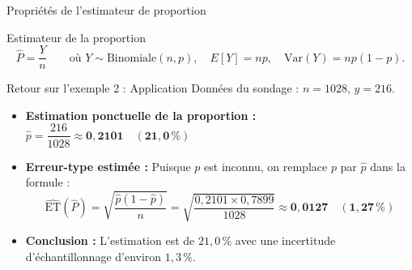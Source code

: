 \documentclass{BeamerTemplate}
\begin{document}
\begin{frame}[t]{Propriétés de l'estimateur de proportion}
  \begin{Boite}{Estimateur de la proportion}
    $$\widehat{P} = \frac{Y}{n} \qquad \text{où } Y \sim \text{Binomiale}(n, p), \quad E[Y] = np, \quad \text{Var}(Y) = np(1-p).$$
  \end{Boite}

  \medskip
\end{frame}

\begin{frame}[t]{Retour sur l'exemple 2 : Application}
  Données du sondage : $n = 1028$, $y = 216$.

  \medskip
  \begin{itemize}\itemsep 3mm
    \item<1-> \textbf{Estimation ponctuelle de la proportion :}
      $\hat{p} = \dfrac{216}{1028} \approx \mathbf{0{,}2101 \quad (21{,}0\,\%)}$

    \item<2-> \textbf{Erreur-type estimée :}
      Puisque $p$ est inconnu, on remplace $p$ par $\hat{p}$ dans la formule :
      $$\widehat{\text{ET}}(\widehat{P}) = \sqrt{\frac{\hat{p}(1-\hat{p})}{n}} = \sqrt{\frac{0{,}2101 \times 0{,}7899}{1028}} \approx \mathbf{0{,}0127 \quad (1{,}27\,\%)}$$

    \item<2-> \textbf{Conclusion :} L'estimation est de $21{,}0\,\%$ avec une incertitude d'échantillonnage d'environ $1{,}3\,\%$.
  \end{itemize}
\end{frame}
\end{document}
